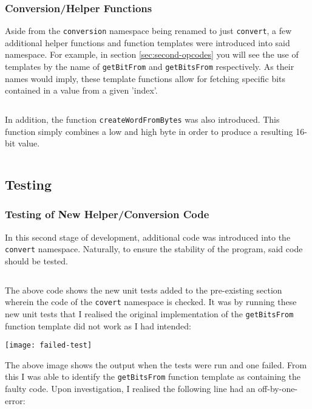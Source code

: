         \inputminted{c++}{code/second/intel8086.cpp}

    \subsubsection{Conversion/Helper Functions}
        Aside from the \texttt{conversion} namespace being renamed to just \texttt{convert}, a few additional helper functions and function templates were introduced into said namespace. For example, in section \ref{sec:second-opcodes} you will see the use of templates by the name of \texttt{getBitFrom} and \texttt{getBitsFrom} respectively. As their names would imply, these template functions allow for fetching specific bits contained in a value from a given 'index'.

        \inputminted{c++}{code/second/convert.hpp}

        In addition, the function \texttt{createWordFromBytes} was also introduced. This function simply combines a low and high byte in order to produce a resulting 16-bit value.

        \inputminted{c++}{code/second/convert.cpp}

\subsection{Testing}

    \subsubsection{Testing of New Helper/Conversion Code}
        In this second stage of development, additional code was introduced into the \texttt{convert} namespace. Naturally, to ensure the stability of the program, said code should be tested.

        \inputminted{c++}{code/second/furthertestconversions.cpp}

        The above code shows the new unit tests added to the pre-existing section wherein the code of the \texttt{covert} namespace is checked. It was by running these new unit tests that I realised the original implementation of the \texttt{getBitsFrom} function template did not work as I had intended:

        \texttt{[image: failed-test]}

        The above image shows the output when the tests were run and one failed. From this I was able to identify the \texttt{getBitsFrom} function template as containing the faulty code. Upon investigation, I realised the following line had an off-by-one-error: 

